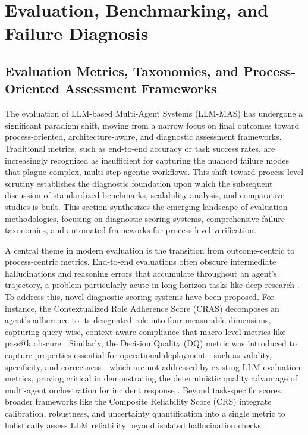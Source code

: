 \documentclass[11pt]{article}
\begin{document}
\section{Evaluation, Benchmarking, and Failure Diagnosis}

\subsection{Evaluation Metrics, Taxonomies, and Process-Oriented Assessment Frameworks}

The evaluation of LLM-based Multi-Agent Systems (LLM-MAS) has undergone a significant paradigm shift, moving from a narrow focus on final outcomes toward process-oriented, architecture-aware, and diagnostic assessment frameworks. Traditional metrics, such as end-to-end accuracy or task success rates, are increasingly recognized as insufficient for capturing the nuanced failure modes that plague complex, multi-step agentic workflows. This shift toward process-level scrutiny establishes the diagnostic foundation upon which the subsequent discussion of standardized benchmarks, scalability analysis, and comparative studies is built. This section synthesizes the emerging landscape of evaluation methodologies, focusing on diagnostic scoring systems, comprehensive failure taxonomies, and automated frameworks for process-level verification.

A central theme in modern evaluation is the transition from outcome-centric to process-centric metrics. End-to-end evaluations often obscure intermediate hallucinations and reasoning errors that accumulate throughout an agent's trajectory, a problem particularly acute in long-horizon tasks like deep research \cite{ref327}. To address this, novel diagnostic scoring systems have been proposed. For instance, the Contextualized Role Adherence Score (CRAS) decomposes an agent's adherence to its designated role into four measurable dimensions, capturing query-wise, context-aware compliance that macro-level metrics like pass@k obscure \cite{ref328}. Similarly, the Decision Quality (DQ) metric was introduced to capture properties essential for operational deployment---such as validity, specificity, and correctness---which are not addressed by existing LLM evaluation metrics, proving critical in demonstrating the deterministic quality advantage of multi-agent orchestration for incident response \cite{ref329}. Beyond task-specific scores, broader frameworks like the Composite Reliability Score (CRS) integrate calibration, robustness, and uncertainty quantification into a single metric to holistically assess LLM reliability beyond isolated hallucination checks \cite{ref330}.
\end{document}
